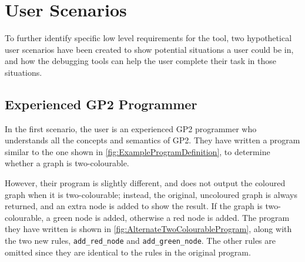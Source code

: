\documentclass[authoryearcitations]{UoYCSproject}
\begin{document}

\section{User Scenarios}
\label{sec:UserScenarios}

To further identify specific low level requirements for the tool, two
hypothetical user scenarios have been created to show potential situations a
user could be in, and how the debugging tools can help the user complete their
task in those situations.


\subsection{Experienced GP2 Programmer}

In the first scenario, the user is an experienced GP2 programmer who understands
all the concepts and semantics of GP2. They have written a program similar to
the one shown in \autoref{fig:ExampleProgramDefinition}, to determine whether a
graph is two-colourable.

However, their program is slightly different, and does not output the coloured
graph when it is two-colourable; instead, the original, uncoloured graph is
always returned, and an extra node is added to show the result. If the graph is
two-colourable, a green node is added, otherwise a red node is added. The
program they have written is shown in \autoref{fig:AlternateTwoColourableProgram},
along with the two new rules, \texttt{add\_red\_node} and \texttt{add\_green\_node}.
The other rules are omitted since they are identical to the rules in the
original program.
\end{document}
